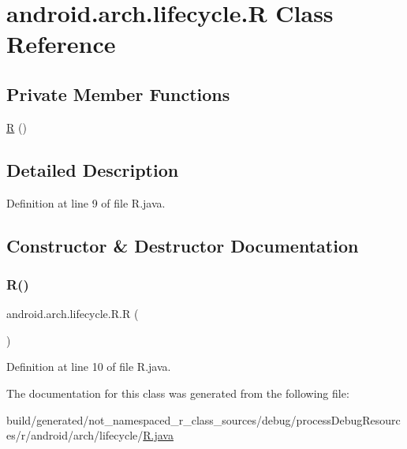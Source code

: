 \hypertarget{classandroid_1_1arch_1_1lifecycle_1_1_r}{}\section{android.\+arch.\+lifecycle.\+R Class Reference}
\label{classandroid_1_1arch_1_1lifecycle_1_1_r}
\subsection*{Private Member Functions}
\begin{DoxyCompactItemize}
\item 
\mbox{\hyperlink{classandroid_1_1arch_1_1lifecycle_1_1_r_aa089f6935ca5e6329cd1e03210fd9ea8}{R}} ()
\end{DoxyCompactItemize}


\subsection{Detailed Description}


Definition at line 9 of file R.\+java.



\subsection{Constructor \& Destructor Documentation}
\mbox{\label{classandroid_1_1arch_1_1lifecycle_1_1_r_aa089f6935ca5e6329cd1e03210fd9ea8}} 
\subsubsection{\texorpdfstring{R()}{R()}}
{\footnotesize\ttfamily android.\+arch.\+lifecycle.\+R.\+R (\begin{DoxyParamCaption}{ }\end{DoxyParamCaption})\hspace{0.3cm}{\ttfamily [private]}}



Definition at line 10 of file R.\+java.


\begin{DoxyCode}{0}

\end{DoxyCode}


The documentation for this class was generated from the following file\+:\begin{DoxyCompactItemize}
\item 
build/generated/not\+\_\+namespaced\+\_\+r\+\_\+class\+\_\+sources/debug/process\+Debug\+Resources/r/android/arch/lifecycle/\mbox{\hyperlink{android_2arch_2lifecycle_2_r_8java}{R.\+java}}\end{DoxyCompactItemize}
